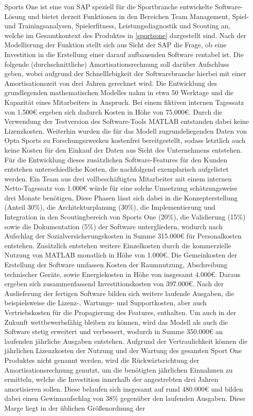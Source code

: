Sports One ist eine von SAP speziell für die Sportbranche entwickelte Software-Lösung und bietet derzeit Funktionen in den Bereichen Team Management, Spiel- und Trainingsanalysen, Spielerfitness, Leistungsdiagnostik und Scouting an, welche im Gesamtkontext des Produktes in \vref{sportsone} dargestellt sind. Nach der Modellierung der Funktion stellt sich aus Sicht der SAP die Frage, ob eine Investition in die Erstellung einer darauf aufbauenden Software rentabel ist. Die folgende (durchschnittliche) Amortisationsrechnung soll darüber Aufschluss geben, wobei aufgrund der Schnelllebigkeit der Softwarebranche hierbei mit einer Amortisationszeit von drei Jahren gerechnet wird. Die Entwicklung des grundlegenden mathematischen Modelles nahm in etwa 50 Werktage und die Kapazität eines Mitarbeiters in Anspruch. Bei einem fiktiven internen Tagessatz von \textsf{1.500\euro} ergeben sich dadurch Kosten in Höhe von \textsf{75.000\euro}. Durch die Verwendung der Testversion des Software-Tools MATLAB entstanden dabei keine Lizenzkosten. Weiterhin wurden die für das Modell zugrundeliegenden Daten von Opta Sports zu Forschungszwecken kostenfrei bereitgestellt, sodass letztlich auch keine Kosten für den Einkauf der Daten aus Sicht des Unternehmens entstehen. Für die Entwicklung dieses zusätzlichen Software-Features für den Kunden entstehen unterschiedliche Kosten, die nachfolgend exemplarisch aufgelistet werden. Ein Team aus drei vollbeschäftigten Mitarbeiter mit einem internen Netto-Tagessatz von \textsf{1.000\euro} würde für eine solche Umsetzung schätzungsweise drei Monate benötigen. Diese Phasen lässt sich dabei in die Konzepterstellung (Anteil 30\%), die Architekturplanung (30\%), die Implementierung und Integration in den Scoutingbereich von Sports One (20\%), die Validierung (15\%) sowie die Dokumentation (5\%) der Software untergliedern, wodurch nach Aufschlag der Sozialversicherungskosten in Summe \textsf{315.000\euro} für Personalkosten entstehen. Zusätzlich entstehen weitere Einzelkosten durch die kommerzielle Nutzung von MATLAB monatlich in Höhe von \textsf{1.000\euro}. Die Gemeinkosten der Erstellung der Software umfassen Kosten der Raumnutzung, Abschreibung technischer Geräte, sowie Energiekosten in Höhe von insgesamt \textsf{4.000\euro}. Daraus ergeben sich zusammenfassend Investitionskosten von \textsf{397.000\euro}. Nach der Auslieferung der fertigen Software bilden sich weitere laufende Ausgaben, die beispielsweise die Lizenz-, Wartungs- und Supportkosten, aber auch Vertriebskosten für die Propagierung des Features, enthalten. Um auch in der Zukunft wettbewerbsfähig bleiben zu können, wird das Modell als auch die Software stetig erweitert und verbessert, wodurch in Summe \textsf{350.000\euro} an laufenden jährliche Ausgaben entstehen. Aufgrund der Vertraulichkeit können die jährlichen Lizenzkosten der Nutzung und der Wartung des gesamten Sport One Produktes nicht genannt werden, wird die Rückwärtsrichtung der Amortisationsrechnung genutzt, um die benötigten jährlichen Einnahmen zu ermitteln, welche die Investition innerhalb der angestrebten drei Jahren amortisieren sollen. Diese belaufen sich insgesamt auf rund \textsf{480.000\euro} und bilden dabei einen Gewinnaufschlag von \textsf{38\%} gegenüber den laufenden Ausgaben. Diese Marge liegt in der üblichen Größenordnung der 